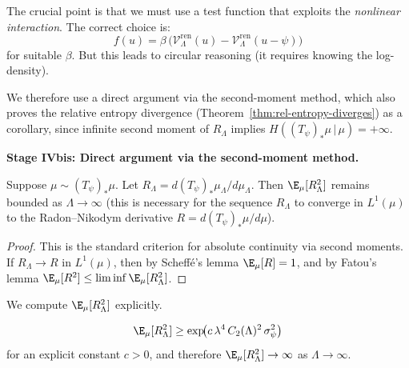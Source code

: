 The crucial point is that we must use a test function that exploits the
\emph{nonlinear interaction}. The correct choice is:
\[
  f(u) = \beta\,\bigl(\mathcal{V}_\Lambda^{\mathrm{ren}}(u)
  - \mathcal{V}_\Lambda^{\mathrm{ren}}(u - \psi)\bigr)
\]
for suitable $\beta$. But this leads to circular reasoning (it requires
knowing the log-density).

We therefore use a direct argument via the second-moment method, which
also proves the relative entropy divergence (Theorem~\ref{thm:rel-entropy-diverges})
as a corollary, since infinite second moment of $R_\Lambda$ implies
$H((T_\psi)_*\mu \,|\, \mu) = +\infty$.

\bigskip
\noindent\textbf{Stage IV\hspace{0.3em}bis: Direct argument via the second-moment method.}

\begin{lemma}\label{lem:second-moment}
Suppose $\mu \sim (T_\psi)_*\mu$. Let $R_\Lambda = d(T_\psi)_*\mu_\Lambda/d\mu_\Lambda$.
Then $\E_\mu[R_\Lambda^2]$ remains bounded as $\Lambda \to \infty$ (this is
necessary for the sequence $R_\Lambda$ to converge in $L^1(\mu)$ to the
Radon--Nikodym derivative $R = d(T_\psi)_*\mu/d\mu$).
\end{lemma}

\begin{proof}
This is the standard criterion for absolute continuity via second moments.
If $R_\Lambda \to R$ in $L^1(\mu)$, then by Scheff\'e's lemma $\E_\mu[R] = 1$,
and by Fatou's lemma $\E_\mu[R^2] \leq \liminf \E_\mu[R_\Lambda^2]$.
\end{proof}

We compute $\E_\mu[R_\Lambda^2]$ explicitly.

\begin{theorem}\label{thm:second-moment-blowup}
\begin{equation}\label{eq:second-moment}
  \E_\mu[R_\Lambda^2] \geq
  \exp\!\bigl(c\,\lambda^4\,C_2(\Lambda)^2\,\sigma_\psi^2\bigr)
\end{equation}
for an explicit constant $c > 0$, and therefore $\E_\mu[R_\Lambda^2] \to \infty$
as $\Lambda \to \infty$.
\end{theorem}

